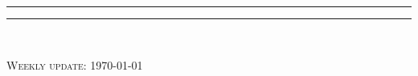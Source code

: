 \begin{titlepage}
\hspace*{-1cm}\begin{minipage}[t]{5cm}
\vspace{0pt}
\textcolor{whoblue!15}{\rule{5cm}{0.595\textheight}}
\end{minipage}
\hspace*{1cm}\begin{minipage}[t]{11.3cm}
\vspace{0pt}
\textcolor{whoblue}{\rule{11.3cm}{0.5mm}}\\[0.535\textheight]
\begin{flushright}
\cleanlookdateon \textsc{\large Weekly update: \today}
\end{flushright}
\end{minipage}

\end{titlepage}
\restoregeometry
